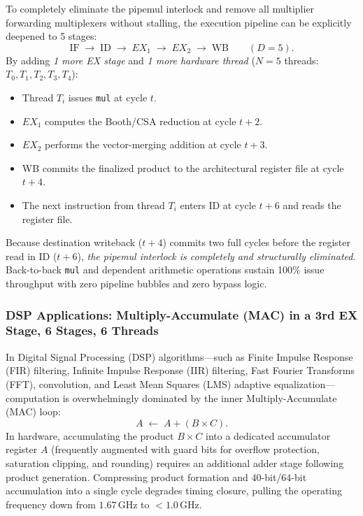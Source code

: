 To completely eliminate the pipemul interlock and remove all multiplier forwarding multiplexers without stalling, the execution pipeline can be explicitly deepened to 5 stages:
\begin{equation}
\text{IF} \;\longrightarrow\; \text{ID} \;\longrightarrow\; EX_1 \;\longrightarrow\; EX_2 \;\longrightarrow\; \text{WB} \qquad (D = 5).
\end{equation}
By adding \textit{1 more EX stage} and \textit{1 more hardware thread} ($N = 5$ threads: $T_0, T_1, T_2, T_3, T_4$):
\begin{itemize}
    \item Thread $T_i$ issues \texttt{mul} at cycle $t$.
    \item $EX_1$ computes the Booth/CSA reduction at cycle $t+2$.
    \item $EX_2$ performs the vector-merging addition at cycle $t+3$.
    \item WB commits the finalized product to the architectural register file at cycle $t+4$.
    \item The next instruction from thread $T_i$ enters ID at cycle $t+6$ and reads the register file.
\end{itemize}
Because destination writeback ($t+4$) commits two full cycles before the register read in ID ($t+6$), \textit{the pipemul interlock is completely and structurally eliminated}. Back-to-back \texttt{mul} and dependent arithmetic operations sustain 100\% issue throughput with zero pipeline bubbles and zero bypass logic.

\subsubsection{DSP Applications: Multiply-Accumulate (MAC) in a 3rd EX Stage, 6 Stages, 6 Threads}
In Digital Signal Processing (DSP) algorithms---such as Finite Impulse Response (FIR) filtering, Infinite Impulse Response (IIR) filtering, Fast Fourier Transforms (FFT), convolution, and Least Mean Squares (LMS) adaptive equalization---computation is overwhelmingly dominated by the inner Multiply-Accumulate (MAC) loop:
\begin{equation}
A \;\longleftarrow\; A + (B \times C).
\end{equation}
In hardware, accumulating the product $B \times C$ into a dedicated accumulator register $A$ (frequently augmented with guard bits for overflow protection, saturation clipping, and rounding) requires an additional adder stage following product generation. Compressing product formation and 40-bit/64-bit accumulation into a single cycle degrades timing closure, pulling the operating frequency down from $1.67\,\text{GHz}$ to $<1.0\,\text{GHz}$.

